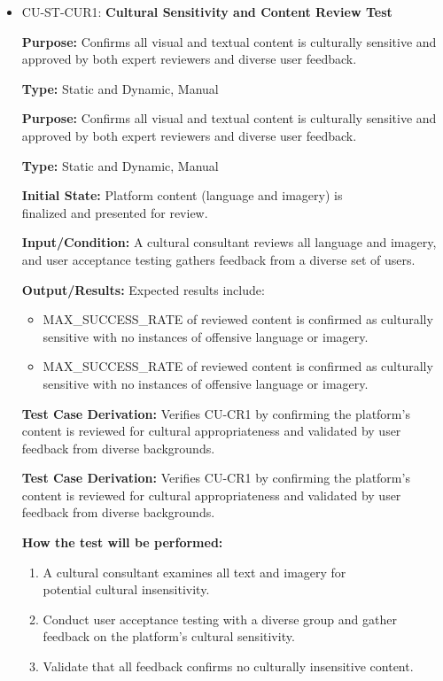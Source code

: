 \documentclass[12pt, titlepage]{article}
\begin{document}
\begin{itemize}
  \item CU-ST-CUR1: \textbf{Cultural Sensitivity and Content Review Test}
  \begin{mdframed}[linewidth=0.5mm] 
    \textbf{Purpose:} Confirms all visual and textual content is culturally sensitive and approved by both expert reviewers and diverse user feedback. \par
    \textbf{Type:} Static and Dynamic, Manual \par 
    \textbf{Purpose:} Confirms all visual and textual content is culturally sensitive and approved by both expert reviewers and diverse user feedback. \par
    \textbf{Type:} Static and Dynamic, Manual \par 
    \textbf{Initial State:} Platform content (language and imagery) is \\finalized and presented for review. \par 
    \textbf{Input/Condition:} A cultural consultant reviews all language and imagery, and user acceptance testing gathers feedback from a diverse set of users. \par 
    \textbf{Output/Results:} Expected results include: 
    \begin{itemize} 
      \item MAX\_SUCCESS\_RATE of reviewed content is confirmed as culturally sensitive with no instances of offensive language or imagery. 
      \item MAX\_SUCCESS\_RATE of reviewed content is confirmed as culturally sensitive with no instances of offensive language or imagery. 
    \end{itemize} \par 
    \textbf{Test Case Derivation:} Verifies CU-CR1 by confirming the platform’s content is reviewed for cultural appropriateness and validated by user feedback from diverse backgrounds. \par 
    \textbf{Test Case Derivation:} Verifies CU-CR1 by confirming the platform’s content is reviewed for cultural appropriateness and validated by user feedback from diverse backgrounds. \par 
    \textbf{How the test will be performed:} 
    \begin{enumerate}[noitemsep] 
      \item A cultural consultant examines all text and imagery for \\potential cultural insensitivity. 
      \item Conduct user acceptance testing with a diverse group and gather feedback on the platform's cultural sensitivity. 
      \item Validate that all feedback confirms no culturally insensitive content. 
    \end{enumerate} 
  \end{mdframed}


\end{itemize}
\end{document}
